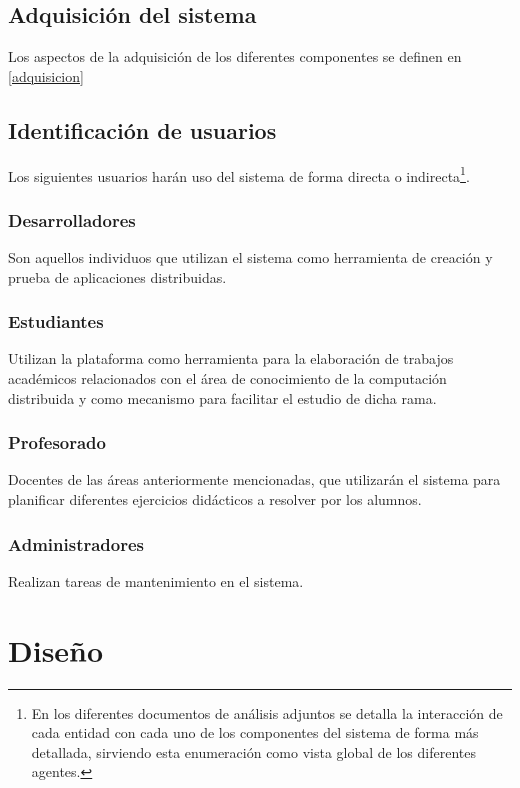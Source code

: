 \subsection{Adquisición del sistema}

Los aspectos de la adquisición de los diferentes componentes se definen en \ref{adquisicion}

\subsection{Identificación de usuarios}

Los siguientes usuarios harán uso del sistema de forma directa o indirecta\footnote{En los diferentes documentos de análisis adjuntos se detalla la interacción de cada entidad con cada uno de los componentes del sistema de forma más detallada, sirviendo esta enumeración como vista global de los diferentes agentes.}.

\subsubsection{Desarrolladores}

Son aquellos individuos que utilizan el sistema como herramienta de creación y prueba de aplicaciones distribuidas.

\subsubsection{Estudiantes}

Utilizan la plataforma como herramienta para la elaboración de trabajos académicos relacionados con el área de conocimiento de la computación distribuida y como mecanismo para facilitar el estudio de dicha rama.

\subsubsection{Profesorado}

Docentes de las áreas anteriormente mencionadas, que utilizarán el sistema para planificar diferentes ejercicios didácticos a resolver por los alumnos.

\subsubsection{Administradores}

Realizan tareas de mantenimiento en el sistema.

\section{Diseño}


